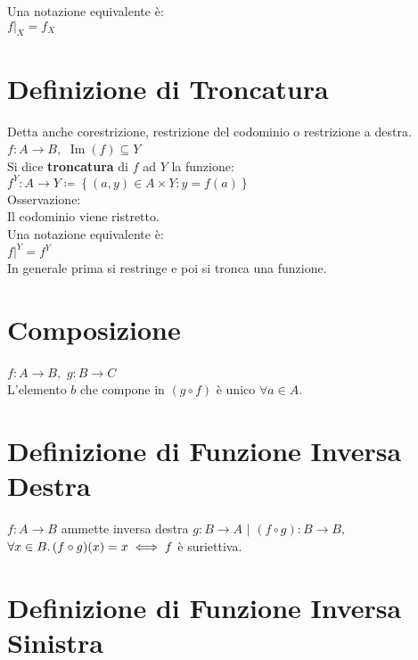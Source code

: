 \documentclass[a4paper, twoside, italian, 11pt]{book}
\newcommand{\braces}[1] {\left \{ #1 \right \}}
\DeclareMathOperator{\Ima}{Im}
\begin{document}
\noindent
Una notazione equivalente è: \\

$f|_X = f_X$



\section{Definizione di Troncatura}

Detta anche corestrizione, restrizione del codominio o restrizione a destra. \\

\noindent
$f : A \rightarrow B,$ $\Ima(f) \subseteq Y$ \\

\noindent
Si dice \textbf{troncatura} di $f$ ad $Y$ la funzione: \\

$f^Y : A \rightarrow Y \coloneqq \braces{(a, y) \in A \times Y : y = f(a)}$ \\

\noindent
Osservazione: \\
Il codominio viene ristretto. \\

\noindent
Una notazione equivalente è: \\

$f|^Y = f^Y$ \\

\noindent
In generale prima si restringe e poi si tronca una funzione.



\section{Composizione}

$f : A \rightarrow B,$ $g : B \rightarrow C$ \\
\noindent
L'elemento $b$ che compone in $(g \circ f)$ è unico $\forall a \in A$.



\section{Definizione di Funzione Inversa Destra}

$f : A \rightarrow B$ ammette inversa destra $g : B \rightarrow A$ $|$ $(f \circ g) : B \rightarrow B,$ $\forall x \in B \ldotp (f \circ g)(x) = x \iff f$ è suriettiva.



\section{Definizione di Funzione Inversa Sinistra}
\end{document}
